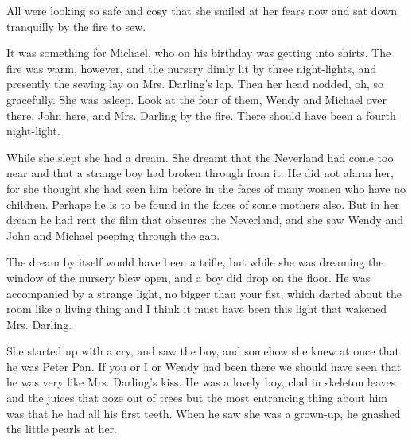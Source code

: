 All were looking so safe and cosy that she smiled at her fears now and sat
down tranquilly by the fire to sew.


It was something for Michael, who on his birthday was getting into shirts.
The fire was warm, however, and the nursery dimly lit by three
night-lights, and presently the sewing lay on Mrs. Darling's lap. Then her
head nodded, oh, so gracefully. She was asleep. Look at the four of them,
Wendy and Michael over there, John here, and Mrs. Darling by the fire.
There should have been a fourth night-light.


While she slept she had a dream. She dreamt that the Neverland had come
too near and that a strange boy had broken through from it. He did not
alarm her, for she thought she had seen him before in the faces of many
women who have no children. Perhaps he is to be found in the faces of some
mothers also. But in her dream he had rent the film that obscures the
Neverland, and she saw Wendy and John and Michael peeping through the gap.


The dream by itself would have been a trifle, but while she was dreaming
the window of the nursery blew open, and a boy did drop on the floor. He
was accompanied by a strange light, no bigger than your fist, which darted
about the room like a living thing and I think it must have been this
light that wakened Mrs. Darling.


She started up with a cry, and saw the boy, and somehow she knew at once
that he was Peter Pan. If you or I or Wendy had been there we should have
seen that he was very like Mrs. Darling's kiss. He was a lovely boy, clad
in skeleton leaves and the juices that ooze out of trees but the most
entrancing thing about him was that he had all his first teeth. When he
saw she was a grown-up, he gnashed the little pearls at her.

